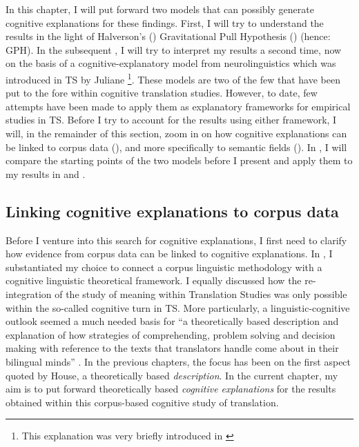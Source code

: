 In this chapter, I will put forward two models that can possibly generate cognitive explanations for these findings. First, I will try to understand the results in the light of Halverson’s (\citeyear{halverson_cognitive_2003, shreve_cognitive_2010, rojo_implications_2013, de_sutter_developing_2017}) Gravitational Pull Hypothesis () (hence: GPH). In the subsequent , I will try to interpret my results a second time, now on the basis of a cognitive-explanatory model from neurolinguistics \citep{paradis_neurolinguistic_2004, kecskes_neurofunctional_2007} which was introduced in TS by Juliane \citet{house_towards_2013}\footnote{This explanation was very briefly introduced in \citet{vandevoorde_corpus-based_2017}}. These models are two of the few that have been put to the fore within cognitive translation studies. However, to date, few attempts have been made to apply them as explanatory frameworks for empirical studies in TS. Before I try to account for the results using either framework, I will, in the remainder of this section, zoom in on how cognitive explanations can be linked to corpus data (), and more specifically to semantic fields (). In , I will compare the starting points of the two models before I present and apply them to my results in  and . 

\subsection{Linking cognitive explanations to corpus data}
\label{sec:5.1.1}  
Before I venture into this search for cognitive explanations, I first need to clarify how evidence from corpus data can be linked to cognitive explanations. In , I substantiated my choice to connect a corpus linguistic methodology with a cognitive linguistic theoretical framework. I equally discussed how the re-integration of the study of meaning within Translation Studies was only possible within the so-called cognitive turn in TS. More particularly, a linguistic-cognitive outlook seemed a much needed basis for “a theoretically based description and explanation of how strategies of comprehending, problem solving and decision making with reference to the texts that translators handle come about in their bilingual minds” \citep[48]{house_towards_2013}. In the previous chapters, the focus has been on the first aspect quoted by House, a theoretically based \textit{description}. In the current chapter, my aim is to put forward theoretically based \textit{cognitive explanations} for the results obtained within this corpus-based cognitive study of translation.


